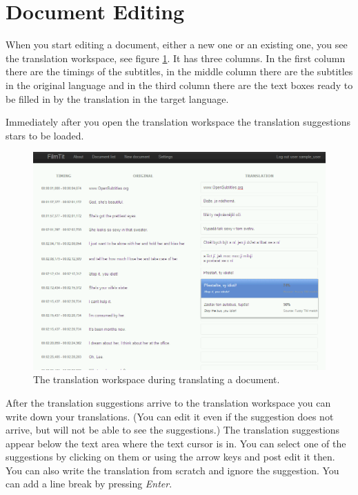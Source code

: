 \section{Document Editing}
\label{sec:document_editing}

When you start editing a document, either a new one or an existing one, you see the translation workspace, see figure \ref{fig:translation_workspace}. It has three columns. In the first column there are the timings of the subtitles, in the middle column there are the subtitles in the original language and in the third column there are the text boxes ready to be filled in by the translation in the target language.

Immediately after you open the translation workspace the translation suggestions stars to be loaded.

\begin{figure}[h]
\begin{center}
\includegraphics[scale=0.4]{figures/user_manual/translation_workspace.png}
\end{center}
\caption{The translation workspace during translating a document.}
\label{fig:translation_workspace}
\end{figure}

After the translation suggestions arrive to the translation workspace you can write down your translations.  (You can edit it even if the suggestion does not arrive, but will not be able to see the suggestions.) The translation suggestions appear below the text area where the text cursor is in. You can select one of the suggestions by clicking on them or using the arrow keys and post edit it then. You can also write the translation from scratch and ignore the suggestion. You can add a line break by pressing \emph{Enter}.

